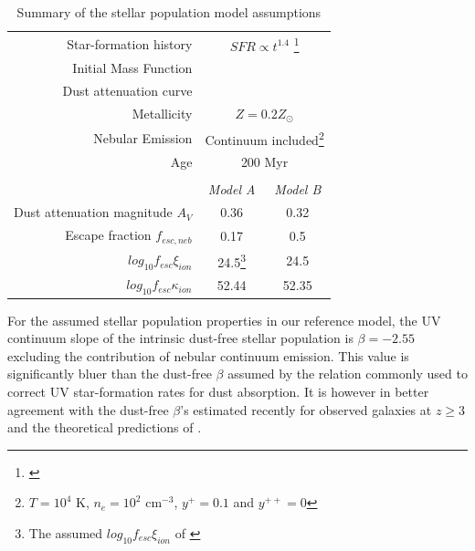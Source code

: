 \begin{table}
    \centering
    \begin{minipage}\textwidth
  \begin{tabular}{r|c c}
     Star-formation history & \multicolumn{2}{c}{$SFR \propto t^{1.4}$ \footnote{\citet{Salmon:2014tm}}}\\
    Initial Mass Function & \multicolumn{2}{c}{\citet{Chabrier:2003ki}} \\
    Dust attenuation curve & \multicolumn{2}{c}{\citet{2000ApJ...533..682C}} \\
    Metallicity & \multicolumn{2}{c}{ $Z = 0.2 Z_{\odot}$ }\\
    Nebular Emission & \multicolumn{2}{c}{Continuum included\footnote{$T=10^4$ K, $n_{e}=10^2$ cm$^{-3}$, $y^{+} = 0.1$ and $y^{++} = 0$}}\\
    Age & \multicolumn{2}{c}{200 Myr}\\
    & & \\
    & \emph{Model A} & \emph{Model B} \\
    Dust attenuation magnitude $A_{V}$ & 0.36 & 0.32 \\
    Escape fraction $f_{esc,neb}$ & 0.17 & 0.5  \\
    $log_{10} f_{esc}\xi_{ion}$ & 24.5\footnote{The assumed  $log_{10} f_{esc}\xi_{ion}$ of \citet{Robertson:2013ji}} & 24.5 \\
    $log_{10} f_{esc}\kappa_{ion}$ & 52.44 & 52.35 \\    
  \end{tabular}
  \caption{Summary of the stellar population model assumptions}
  \label{tab:fiducial}
  \end{minipage}
\end{table}

For the assumed stellar population properties in our reference model, the UV continuum slope of the intrinsic dust-free stellar population is $\beta = -2.55$ excluding the contribution of nebular continuum emission. This value is significantly bluer than the dust-free $\beta$ assumed by the \citet{Meurer:1999jm} relation commonly used to correct UV star-formation rates for dust absorption. It is however in better agreement with the dust-free $\beta$'s estimated recently for observed galaxies at $z\geq 3$ \citep{Castellano:2014db,deBarros:2014fa} and the theoretical predictions of \citet{Dayal:2012kp}. 

